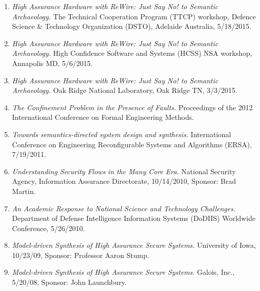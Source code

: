 \documentclass[12pt]{article} %
\begin{document}
\begin{enumerate}[leftmargin=0mm]
\item{\it High Assurance Hardware with ReWire: Just Say No! to Semantic Archaeology.}
The Technical Cooperation Program (TTCP) workshop, Defence Science \& Technology Organization (DSTO), Adelaide Australia, 5/18/2015.






\item{\it High Assurance Hardware with ReWire: Just Say No! to Semantic Archaeology.}
High Confidence Software and Systems (HCSS) NSA workshop, Annapolis MD, 5/6/2015.

\item{\it High Assurance Hardware with ReWire: Just Say No! to Semantic Archaeology.}
Oak Ridge National Laboratory, Oak Ridge TN, 3/3/2015.

\item{\it The Confinement Problem in the Presence of Faults.} Proceedings of the 2012 International Conference on Formal Engineering Methods.

\item{\it Towards semantics-directed system design and synthesis.}
International Conference on
  Engineering Reconfigurable Systems and Algorithms (ERSA), 7/19/2011.
  
\item{\it Understanding Security Flows in the Many Core Era.}
National Security Agency, Information Assurance Directorate, 
10/14/2010, Sponsor: Brad Martin.

\item{\it An Academic Response to National Science and Technology Challenges.}
Department of Defense Intelligence Information Systems (DoDIIS) Worldwide Conference, 5/26/2010.

\item{\it Model-driven Synthesis of High Assurance Secure Systems.} University of Iowa, 10/23/09, Sponsor: Professor Aaron Stump.

\item{\it Model-driven Synthesis of High Assurance Secure Systems.} Galois, Inc., 5/20/08, Sponsor: John Launchbury.



\end{enumerate}
\end{document}
